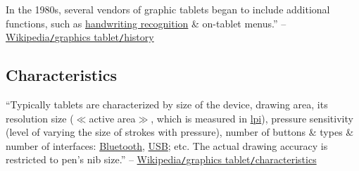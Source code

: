 \documentclass[oneside]{book}
\numberwithin{equation}{section}
\begin{document}
In the 1980s, several vendors of graphic tablets began to include additional functions, such as \href{https://en.wikipedia.org/wiki/Handwriting_recognition}{handwriting recognition} \& on-tablet menus.'' -- \href{https://en.wikipedia.org/wiki/Graphics_tablet#History}{Wikipedia\texttt{/}graphics tablet\texttt{/}history}

\subsection{Characteristics}
``Typically tablets are characterized by size of the device, drawing area, its resolution size ($\ll$active area$\gg$, which is measured in \href{https://en.wikipedia.org/wiki/Lines_per_inch}{lpi}), pressure sensitivity (level of varying the size of strokes with pressure), number of buttons \& types \& number of interfaces: \href{https://en.wikipedia.org/wiki/Bluetooth}{Bluetooth}, \href{https://en.wikipedia.org/wiki/USB}{USB}; etc. The actual drawing accuracy is restricted to pen's nib size.'' -- \href{https://en.wikipedia.org/wiki/Graphics_tablet#Characteristics}{Wikipedia\texttt{/}graphics tablet\texttt{/}characteristics}
\end{document}
